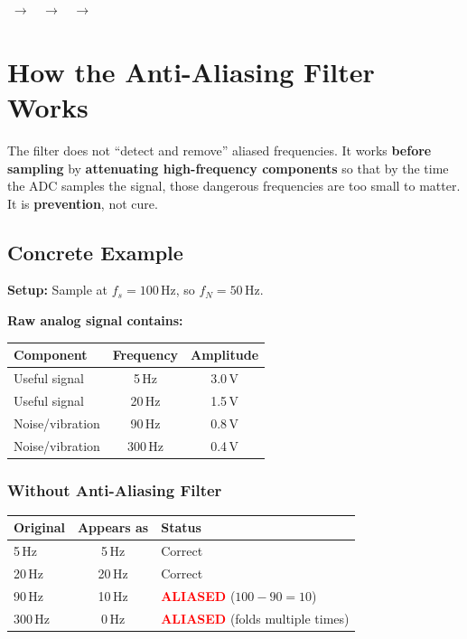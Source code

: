\documentclass[12pt,a4paper]{article}
\begin{document}
\begin{center}
$\;\longrightarrow\;$
$\;\longrightarrow\;$
$\;\longrightarrow\;$
\end{center}

\section{How the Anti-Aliasing Filter Works}

The filter does not ``detect and remove'' aliased frequencies. It works \textbf{before sampling} by \textbf{attenuating high-frequency components} so that by the time the ADC samples the signal, those dangerous frequencies are too small to matter. It is \textbf{prevention}, not cure.

\subsection{Concrete Example}

\textbf{Setup:} Sample at $f_s = 100$\,Hz, so $f_N = 50$\,Hz.

\textbf{Raw analog signal contains:}

\begin{center}
\begin{tabular}{lcc}
    \toprule
    \textbf{Component} & \textbf{Frequency} & \textbf{Amplitude} \\
    \midrule
    Useful signal    & 5\,Hz   & 3.0\,V \\
    Useful signal    & 20\,Hz  & 1.5\,V \\
    Noise/vibration  & 90\,Hz  & 0.8\,V \\
    Noise/vibration  & 300\,Hz & 0.4\,V \\
    \bottomrule
\end{tabular}
\end{center}

\subsubsection{Without Anti-Aliasing Filter}

\begin{center}
\begin{tabular}{lcl}
    \toprule
    \textbf{Original} & \textbf{Appears as} & \textbf{Status} \\
    \midrule
    5\,Hz   & 5\,Hz  & Correct \\
    20\,Hz  & 20\,Hz & Correct \\
    90\,Hz  & 10\,Hz & \textcolor{red}{\textbf{ALIASED}} ($100 - 90 = 10$) \\
    300\,Hz & 0\,Hz  & \textcolor{red}{\textbf{ALIASED}} (folds multiple times) \\
    \bottomrule
\end{tabular}
\end{center}
\end{document}
